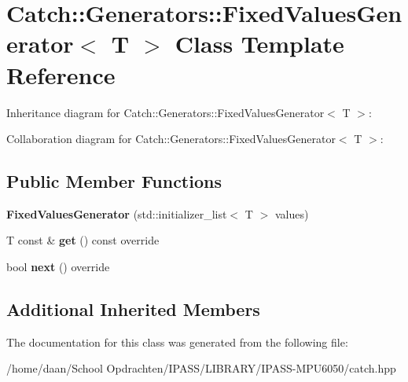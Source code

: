 \hypertarget{classCatch_1_1Generators_1_1FixedValuesGenerator}{}\section{Catch\+:\+:Generators\+:\+:Fixed\+Values\+Generator$<$ T $>$ Class Template Reference}
\label{classCatch_1_1Generators_1_1FixedValuesGenerator}


Inheritance diagram for Catch\+:\+:Generators\+:\+:Fixed\+Values\+Generator$<$ T $>$\+:


Collaboration diagram for Catch\+:\+:Generators\+:\+:Fixed\+Values\+Generator$<$ T $>$\+:
\subsection*{Public Member Functions}
\begin{DoxyCompactItemize}
\item 
\mbox{\label{classCatch_1_1Generators_1_1FixedValuesGenerator_a6e9f473655413c1cb15f079890f06b86}} 
{\bfseries Fixed\+Values\+Generator} (std\+::initializer\+\_\+list$<$ T $>$ values)
\item 
\mbox{\label{classCatch_1_1Generators_1_1FixedValuesGenerator_ad2ea8c959c600386bcc4b2656b40d33e}} 
T const  \& {\bfseries get} () const override
\item 
\mbox{\label{classCatch_1_1Generators_1_1FixedValuesGenerator_a6ce9e3ed045239c7b82873f24bd9cd3b}} 
bool {\bfseries next} () override
\end{DoxyCompactItemize}
\subsection*{Additional Inherited Members}


The documentation for this class was generated from the following file\+:\begin{DoxyCompactItemize}
\item 
/home/daan/\+School Opdrachten/\+I\+P\+A\+S\+S/\+L\+I\+B\+R\+A\+R\+Y/\+I\+P\+A\+S\+S-\/\+M\+P\+U6050/catch.\+hpp\end{DoxyCompactItemize}
